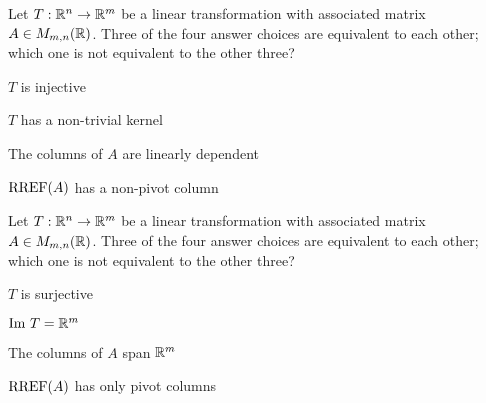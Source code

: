 \documentclass{article}
\begin{document}
\begin{readinessAssuranceTest}
\item Let $T: \mathbb{R}^n \rightarrow \mathbb{R}^m$ be a linear transformation with associated matrix $A \in M_{m,n}(\mathbb{R})$.  Three of the four answer choices are equivalent to each other; which one is not equivalent to the other three?
\begin{readinessAssuranceTestChoices}
\item $T$ is injective
\item $T$ has a non-trivial kernel
\item The columns of $A$ are linearly dependent
\item $\operatorname{RREF}(A)$ has a non-pivot column
\end{readinessAssuranceTestChoices}

\item Let $T: \mathbb{R}^n \rightarrow \mathbb{R}^m$ be a linear transformation with associated matrix $A \in M_{m,n}(\mathbb{R})$.  Three of the four answer choices are equivalent to each other; which one is not equivalent to the other three?
\begin{readinessAssuranceTestChoices}
\item $T$ is surjective
\item ${\rm Im\ } T = \mathbb{R}^m$
\item The columns of $A$ span $\mathbb{R}^m$
\item $\operatorname{RREF}(A)$ has only pivot columns
\end{readinessAssuranceTestChoices}
%
%

\end{readinessAssuranceTest}
\end{document}
